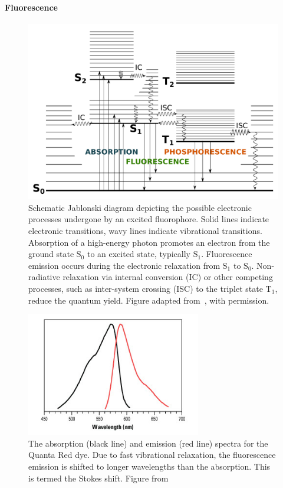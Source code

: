 \paragraph{Fluorescence}
\label{sect:fluorescence}
\begin{figure}[!ht]
   \begin{center}
      \includegraphics*[clip=true, width=6in]{introduction/jablonski.pdf}
      \caption{Schematic Jablonski diagram depicting the possible electronic processes undergone by an excited fluorophore. Solid lines indicate electronic transitions, wavy lines indicate vibrational transitions. Absorption of a high-energy photon promotes an electron from the ground state $\text{S}_0$ to an excited state, typically $\text{S}_1$. Fluorescence emission occurs during the electronic relaxation from $\text{S}_1$ to $\text{S}_0$. Non-radiative relaxation via internal conversion (IC) or other competing processes, such as inter-system crossing (ISC) to the triplet state $\text{T}_1$, reduce the quantum yield. Figure adapted from~\cite{Horrocks2014}, with permission.}
      \label{fig:jablonski}
   \end{center}
\end{figure}

\begin{figure}
	\begin{center}
	\includegraphics*[clip=true, width=3in]{introduction/QuantaRed-Spectra.jpg}
	\caption{The absorption (black line) and emission (red line) spectra for the Quanta Red dye. Due to fast vibrational relaxation, the fluorescence emission is shifted to longer wavelengths than the absorption. This is termed the Stokes shift. Figure from~\cite{spectral}}
	\label{fig:stokes}
	\end{center}
\end{figure}

